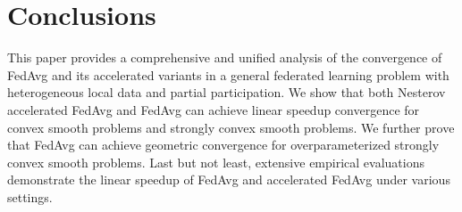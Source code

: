 
\section{Conclusions}
\begin{comment}
This paper provides a comprehensive and unified analysis of the convergence rate of FedAvg
and its accelerated variants in a general federated learning problem with heterogeneous local data and partial participation. We show that both Nesterov accelerated FedAvg and FedAvg
can achieve {\small{$\cO(\frac{1}{\sqrt{NT}})$}} linear speedup convergence for convex smooth problems and {\small{$\cO(\frac{1}{NT})$}} convergence for strongly 
convex smooth problems. In addition, we show that the local steps for stronlgy convex and convex smooth problems can be as large as {\small{$\cO(\sqrt{\frac{T}{N}})$}}, which can substantially save communication cost comparing to prior results. 
Furthermore, this work also makes algorithmic contributions. We not only prove that FedAvg can achieve exponential convergence for overparameterized strongly convex smooth problems, but also propose the MaSS accelerated Fedavg algorithm, which has provable speedup in convergence rate over FedAvg on quadratic problems. Last but not least, we empirically
verify the linear speedup of FedAvg and Nesterov accelerated FedAvg for strongly convex, convex smooth, and linear regression problems. The empirical results are well-aligned with our theories.		
\end{comment}
This paper provides a comprehensive and unified analysis of the convergence of FedAvg
and its accelerated variants in a general federated learning problem with heterogeneous local data and partial participation. 
We show that both Nesterov accelerated FedAvg and FedAvg can achieve linear speedup convergence for convex smooth problems and strongly 
convex smooth problems. We further prove that FedAvg can achieve geometric convergence for overparameterized strongly convex smooth problems. Last but not least, extensive empirical 
evaluations demonstrate the linear speedup of FedAvg and accelerated FedAvg under various settings.		
